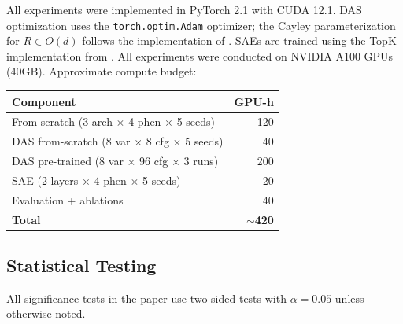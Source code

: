 \documentclass[11pt]{article}
\begin{document}
All experiments were implemented in PyTorch 2.1 with CUDA 12.1.
DAS optimization uses the \texttt{torch.optim.Adam} optimizer; the Cayley parameterization for $R \in O(d)$ follows the implementation of \citet{DBLP:conf/clear2/GeigerWPIG24}.
SAEs are trained using the TopK implementation from \citet{DBLP:conf/iclr/GaoTTGTRSL025}.
All experiments were conducted on NVIDIA A100 GPUs (40GB).
Approximate compute budget:

\begin{center}
\small
\begin{tabular}{@{}lr@{}}
\toprule
\textbf{Component} & \textbf{GPU-h} \\
\midrule
From-scratch (3 arch $\times$ 4 phen $\times$ 5 seeds) & 120 \\
DAS from-scratch (8 var $\times$ 8 cfg $\times$ 5 seeds) & 40 \\
DAS pre-trained (8 var $\times$ 96 cfg $\times$ 3 runs) & 200 \\
SAE (2 layers $\times$ 4 phen $\times$ 5 seeds) & 20 \\
Evaluation + ablations & 40 \\
\midrule
\textbf{Total} & $\sim$\textbf{420} \\
\bottomrule
\end{tabular}
\end{center}

\subsection{Statistical Testing}
\label{app:stats}

All significance tests in the paper use two-sided tests with $\alpha = 0.05$ unless otherwise noted.
\end{document}

